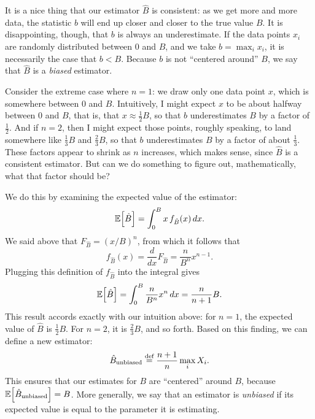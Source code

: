 It is a nice thing that our estimator $\hat{B}$ is consistent: as we get more
and more data, the statistic $b$ will end up closer and closer to the true value
$B$. It is disappointing, though, that $b$ is always an underestimate. If the
data points $x_i$ are randomly distributed between $0$ and $B$, and we take
$b = \max_i x_i$, it is necessarily the case that $b < B$. Because $b$ is not
``centered around'' $B$, we say that $\hat{B}$ is a \emph{biased} estimator.

Consider the extreme case where $n=1$: we draw only one data point $x$, which is
somewhere between $0$ and $B$. Intuitively, I might expect $x$ to be about
halfway between $0$ and $B$, that is, that $x \approx \tfrac{1}{2}B$, so that
$b$ underestimates $B$ by a factor of $\tfrac{1}{2}$. And if
$n=2$, then I might expect those points, roughly speaking, to land somewhere
like $\tfrac{1}{3}B$ and $\tfrac{2}{3}B$, so that $b$ underestimates $B$ by
a factor of about $\tfrac{1}{3}$. These factors appear to shrink as $n$ increases,
which makes sense, since $\hat{B}$ is a consistent estimator. But can we do
something to figure out, mathematically, what that factor should be?

We do this by examining the expected value of the estimator:
\begin{equation*}
    \mathbb{E}\!\left[{\hat{B}}\right] = \int_0^B x \, f_{\hat{B}}(x) \, dx.
\end{equation*}
We said above that $F_{\hat{B}} = (x/B)^n$, from which it follows that
\begin{equation*}
    f_{\hat{B}}(x) = \frac{d}{dx} F_{\hat{B}} = \frac{n}{B^n} x^{n-1}.
\end{equation*}
Plugging this definition of $f_{\hat{B}}$ into the integral gives
\begin{equation*}
    \mathbb{E}\!\left[{\hat{B}}\right] = \int_0^B \frac{n}{B^n} x^n \, dx = \frac{n}{n+1} B.
\end{equation*}
This result accords exactly with our intuition above: for $n=1$, the expected
value of $\hat{B}$ is $\tfrac{1}{2}B$. For $n=2$, it is $\tfrac{2}{3}B$, and
so forth. Based on this finding, we can define a new estimator:
\begin{equation}
\hat{B}_\mathrm{unbiased} \stackrel{\text{def}}{=} \frac{n+1}{n} \max_i X_i.
\end{equation}
This ensures that our estimates for $B$ are ``centered'' around $B$, because
$\mathbb{E}\!\left[{\hat{B}_\mathrm{unbiased}}\right] = B$. More generally, we say that an estimator
is \emph{unbiased} if its expected value is equal to the parameter it is estimating.

